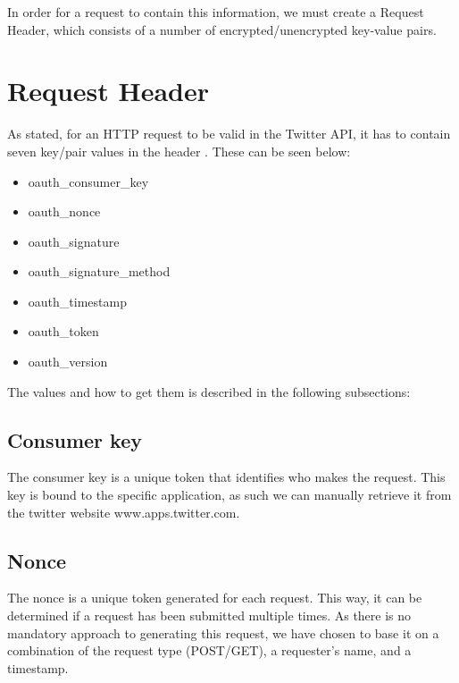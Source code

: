 In order for a request to contain this information, we must create a Request
Header, which consists of a number of encrypted/unencrypted key-value pairs. 

\section{Request Header}\label{sec:reqHead}
As stated, for an \ac{HTTP} request to be valid in the Twitter API, it has to
contain seven key/pair values in the header \citep{TwitterAPIAuth}. These can
be seen below:

\begin{itemize}
  \item oauth\_consumer\_key
  \item oauth\_nonce
  \item oauth\_signature
  \item oauth\_signature\_method
  \item oauth\_timestamp
  \item oauth\_token
  \item oauth\_version
\end{itemize}

The values and how to get them is described in the following subsections:

\subsection*{Consumer key}
The consumer key is a unique token that identifies who makes the request.
This key is bound to the specific application, as such we can manually retrieve
it from the twitter website www.apps.twitter.com.

\subsection*{Nonce}
The nonce is a unique token generated for each request. This way, it can be
determined if a request has been submitted multiple times. As there is no
mandatory approach to generating this request, we have chosen to base it on a
combination of the request type (POST/GET), a requester's name, and a timestamp.

